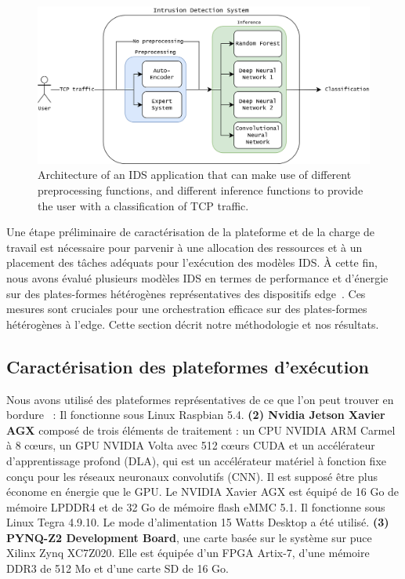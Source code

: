 \begin{figure}[t]
\centering
\includegraphics[width=0.8\columnwidth]{6_Chapitre4/figures/ids-application.png}
\caption{Architecture of an IDS application that can make use of different preprocessing functions, and different inference functions to provide the user with a classification of TCP traffic.}
\label{figure:herocache-ids-application}
\end{figure}

Une étape préliminaire de caractérisation de la plateforme et de la charge de travail est nécessaire pour parvenir à une allocation des ressources et à un placement des tâches adéquats pour l'exécution des modèles IDS. À cette fin, nous avons évalué plusieurs modèles IDS en termes de performance et d'énergie sur des plates-formes hétérogènes représentatives des dispositifs edge~\cite{kljucaric2020}. Ces mesures sont cruciales pour une orchestration efficace sur des plates-formes hétérogènes à l'edge. Cette section décrit notre méthodologie et nos résultats.

\subsection{Caractérisation des plateformes d'exécution} \label{section:herocache-characterization-platforms}

Nous avons utilisé des plateformes représentatives de ce que l'on peut trouver en bordure~\cite{slimani:hal-04159551,kljucaric2020} : 
 Il fonctionne sous Linux Raspbian 5.4.
\textbf{(2) Nvidia Jetson Xavier AGX} composé de trois éléments de traitement : un CPU NVIDIA ARM Carmel à 8 cœurs, un GPU NVIDIA Volta avec 512 cœurs CUDA et un accélérateur d'apprentissage profond (DLA), qui est un accélérateur matériel à fonction fixe conçu pour les réseaux neuronaux convolutifs (CNN). Il est supposé être plus économe en énergie que le GPU. Le NVIDIA Xavier AGX est équipé de 16 Go de mémoire LPDDR4 et de 32 Go de mémoire flash eMMC 5.1. Il fonctionne sous Linux Tegra 4.9.10. Le mode d'alimentation 15 Watts Desktop a été utilisé. 
\textbf{(3) PYNQ-Z2 Development Board}, une carte basée sur le système sur puce Xilinx Zynq XC7Z020. Elle est équipée d'un FPGA Artix-7, d'une mémoire DDR3 de 512 Mo et d'une carte SD de 16 Go.


